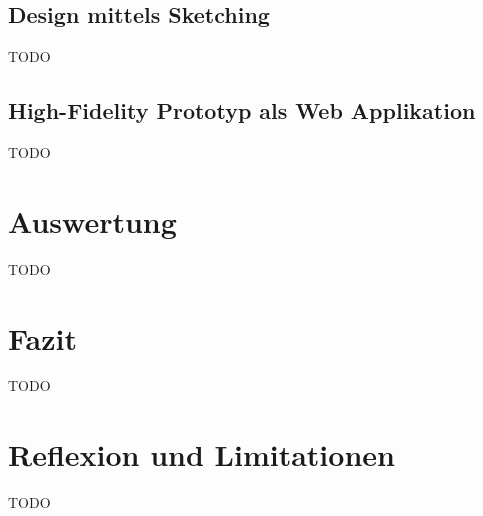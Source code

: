 \documentclass[12pt, oneside]{article}
\begin{document}
\subsection{Design mittels Sketching}
TODO

\subsection{High-Fidelity Prototyp als Web Applikation}
TODO

\clearpage
\section{Auswertung}
TODO

\clearpage
\section{Fazit}
TODO

\clearpage
\section{Reflexion und Limitationen}
TODO


\clearpage



\clearpage
\end{document}
